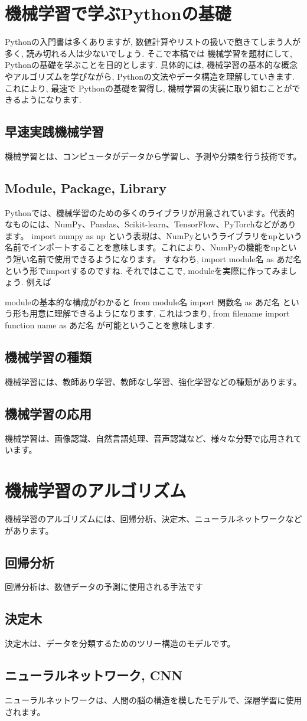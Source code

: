 \documentclass{ltjsarticle}      %
\begin{document}
\section{機械学習で学ぶPythonの基礎}
 Pythonの入門書は多くありますが, 数値計算やリストの扱いで飽きてしまう人が多く, 読み切れる人は少ないでしょう. そこで本稿では
 機械学習を題材にして, Pythonの基礎を学ぶことを目的とします. 具体的には, 機械学習の基本的な概念やアルゴリズムを学びながら, 
 Pythonの文法やデータ構造を理解していきます. これにより, 最速で Pythonの基礎を習得し, 機械学習の実装に取り組むことができるようになります.
\subsection{早速実践機械学習}
 機械学習とは、コンピュータがデータから学習し、予測や分類を行う技術です。
\subsection{Module, Package, Library}
 Pythonでは、機械学習のための多くのライブラリが用意されています。代表的なものには、NumPy、Pandas、Scikit-learn、TensorFlow、PyTorchなどがあります。
 import numpy as np
 という表現は、NumPyというライブラリをnpという名前でインポートすることを意味します。これにより、NumPyの機能をnpという短い名前で使用できるようになります。
 すなわち, import module名 as あだ名 という形でimportするのですね.
 それではここで, moduleを実際に作ってみましょう. 例えば

 moduleの基本的な構成がわかると
 from module名  import 関数名 as あだ名
 という形も用意に理解できるようになります. これはつまり, from filename import function name as あだ名 が可能ということを意味します.
\subsection{機械学習の種類}
 機械学習には、教師あり学習、教師なし学習、強化学習などの種類があります。
\subsection{機械学習の応用}
 機械学習は、画像認識、自然言語処理、音声認識など、様々な分野で応用されています。
\section{機械学習のアルゴリズム}
 機械学習のアルゴリズムには、回帰分析、決定木、ニューラルネットワークなどがあります。
\subsection{回帰分析}
 回帰分析は、数値データの予測に使用される手法です
\subsection{決定木}
 決定木は、データを分類するためのツリー構造のモデルです。
\subsection{ニューラルネットワーク, CNN}
 ニューラルネットワークは、人間の脳の構造を模したモデルで、深層学習に使用されます。
\end{document}
